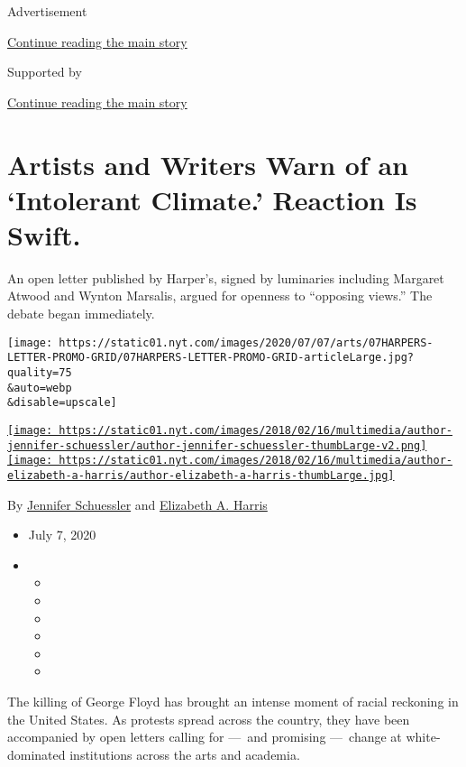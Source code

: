Advertisement

\protect\hyperlink{after-top}{Continue reading the main story}

Supported by

\protect\hyperlink{after-sponsor}{Continue reading the main story}

\hypertarget{artists-and-writers-warn-of-an-intolerant-climate-reaction-is-swift}{%
\section{Artists and Writers Warn of an `Intolerant Climate.' Reaction
Is
Swift.}\label{artists-and-writers-warn-of-an-intolerant-climate-reaction-is-swift}}

An open letter published by Harper's, signed by luminaries including
Margaret Atwood and Wynton Marsalis, argued for openness to ``opposing
views.'' The debate began immediately.

\texttt{[image: https://static01.nyt.com/images/2020/07/07/arts/07HARPERS-LETTER-PROMO-GRID/07HARPERS-LETTER-PROMO-GRID-articleLarge.jpg?quality=75\\\&auto=webp\\\&disable=upscale]}

\href{https://www.nytimes.com/by/jennifer-schuessler}{\texttt{[image: https://static01.nyt.com/images/2018/02/16/multimedia/author-jennifer-schuessler/author-jennifer-schuessler-thumbLarge-v2.png]}}\href{https://www.nytimes.com/by/elizabeth-a-harris}{\texttt{[image: https://static01.nyt.com/images/2018/02/16/multimedia/author-elizabeth-a-harris/author-elizabeth-a-harris-thumbLarge.jpg]}}

By \href{https://www.nytimes.com/by/jennifer-schuessler}{Jennifer
Schuessler} and
\href{https://www.nytimes.com/by/elizabeth-a-harris}{Elizabeth A.
Harris}

\begin{itemize}
\item
  July 7, 2020
\item
  \begin{itemize}
  \item
  \item
  \item
  \item
  \item
  \item
  \end{itemize}
\end{itemize}

The killing of George Floyd has brought an intense moment of racial
reckoning in the United States. As protests spread across the country,
they have been accompanied by open letters calling for ---~and promising
---~change at white-dominated institutions across the arts and academia.

